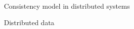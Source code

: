 \documentclass{beamer}
\begin{document}
\begin{frame}{Consistency model in distributed systems}
  \begin{figure}[h!]
    \centering
    \begin{adjustbox}{max totalsize = {1.00\textwidth}{1.00\textheight}, center}
	  
    \end{adjustbox}
  \end{figure}
\end{frame}

\begin{frame}{Distributed data}
  \begin{figure}[h!]
    \centering
    \begin{adjustbox}{max totalsize = {0.60\textwidth}{1.00\textheight}, center}
	  
    \end{adjustbox}
  \end{figure}
\end{frame}
\end{document}
